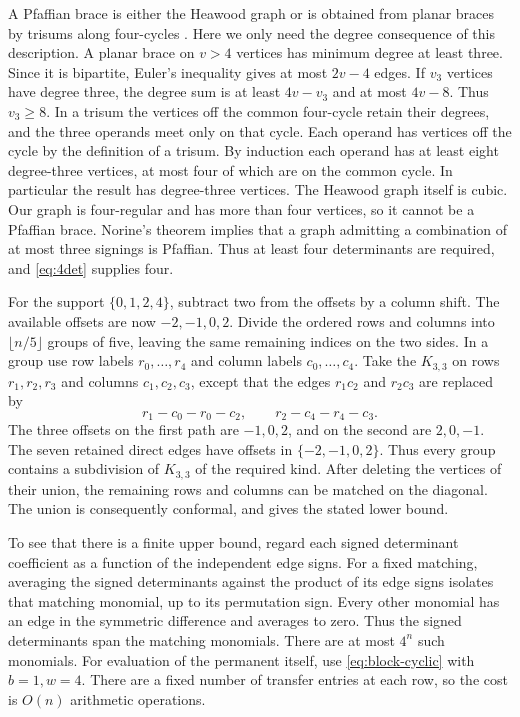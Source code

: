 \documentclass[11pt,reqno]{amsart}
\theoremstyle{remark}
\numberwithin{equation}{section}
\begin{document}
A Pfaffian brace is either the Heawood graph or is obtained from planar
braces by trisums along four-cycles \cite{RST}. Here we only need the
degree consequence of this description. A planar brace on \(v>4\)
vertices has minimum degree at least three. Since it is bipartite,
Euler's inequality gives at most \(2v-4\) edges. If \(v_3\) vertices have
degree three, the degree sum is at least \(4v-v_3\) and at most \(4v-8\).
Thus \(v_3\ge8\). In a trisum the vertices off the common four-cycle
retain their degrees, and the three operands meet only on that cycle.
Each operand has vertices off the cycle by the definition of a trisum. By
induction each operand has at least eight degree-three vertices, at most
four of which are on the common cycle. In particular the result has
degree-three vertices. The Heawood graph itself is cubic. Our graph is
four-regular and has more than four vertices, so it cannot be a Pfaffian
brace. Norine's theorem \cite{Norine} implies that a graph admitting a
combination of at most three signings is Pfaffian. Thus at least four
determinants are required, and \eqref{eq:4det} supplies four.

For the support \(\{0,1,2,4\}\), subtract two from the offsets by a
column shift. The available offsets are now \(-2,-1,0,2\). Divide the
ordered rows and columns into \(\lfloor n/5\rfloor\) groups of five,
leaving the same remaining indices on the two sides. In a group use row
labels \(r_0,\ldots,r_4\) and column labels \(c_0,\ldots,c_4\). Take the
\(K_{3,3}\) on rows \(r_1,r_2,r_3\) and columns \(c_1,c_2,c_3\), except
that the edges \(r_1c_2\) and \(r_2c_3\) are replaced by
\[
 r_1-c_0-r_0-c_2,\qquad r_2-c_4-r_4-c_3 .
\]
The three offsets on the first path are \(-1,0,2\), and on the second are
\(2,0,-1\). The seven retained direct edges have offsets in
\(\{-2,-1,0,2\}\). Thus every group contains a subdivision of \(K_{3,3}\)
of the required kind. After deleting the vertices of their union, the
remaining rows and columns can be matched on the diagonal. The union is
consequently conformal, and \cite[Corollary 4.3]{PantSingh} gives the
stated lower bound.

To see that there is a finite upper bound, regard each signed determinant
coefficient as a function of the independent edge signs. For a fixed
matching, averaging the signed determinants against the product of its
edge signs isolates that matching monomial, up to its permutation sign.
Every other monomial has an edge in the symmetric difference and averages
to zero. Thus the signed determinants span the matching monomials. There
are at most \(4^n\) such monomials. For evaluation of the permanent
itself, use \eqref{eq:block-cyclic} with \(b=1,w=4\). There are a fixed
number of transfer entries at each row, so the cost is \(O(n)\)
arithmetic operations.
\end{document}
